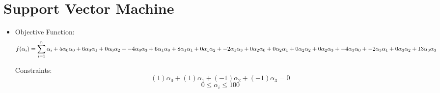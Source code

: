 \documentclass{paper}
\begin{document}
\section{Support Vector Machine}

\begin{itemize}
    \item

    Objective Function:
    \begin{equation*}
f(\alpha_i) = \sum_{i=1}^n \alpha_i
 + 5 \alpha_0\alpha_0
 + 6 \alpha_0\alpha_1
 + 0 \alpha_0\alpha_2 \\ %
 + -4 \alpha_0\alpha_3
 + 6 \alpha_1\alpha_0
 + 8 \alpha_1\alpha_1
 + 0 \alpha_1\alpha_2 \\
 + -2 \alpha_1\alpha_3
 + 0 \alpha_2\alpha_0
 + 0 \alpha_2\alpha_1
 + 0 \alpha_2\alpha_2 \\
 + 0 \alpha_2\alpha_3
 + -4 \alpha_3\alpha_0
 + -2 \alpha_3\alpha_1
 + 0 \alpha_3\alpha_2
 + 13 \alpha_3\alpha_3
 \end{equation*}

Constraints:
\[
(1)\alpha_0 +
(1)\alpha_1 +
(-1)\alpha_2 +
(-1)\alpha_3 = 0 \]
\[  0 \le \alpha_i \le 100 \]
\end{itemize}
\end{document}
